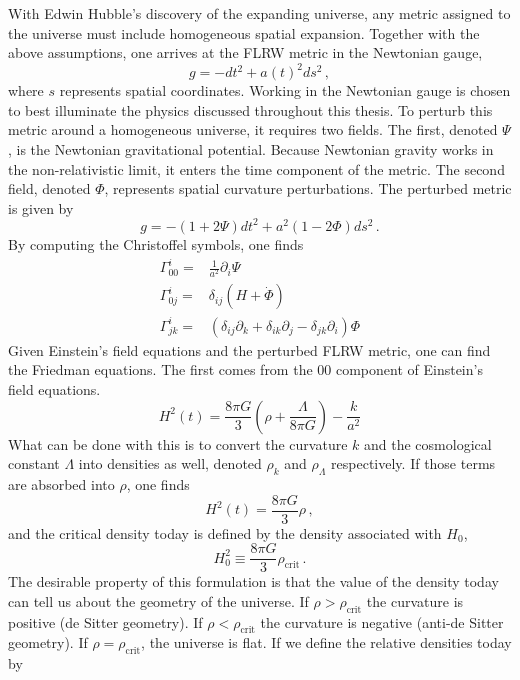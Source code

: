With Edwin Hubble's discovery of the expanding universe, any metric assigned to the universe must include homogeneous spatial expansion. Together with the above assumptions, one arrives at the FLRW metric in the Newtonian gauge,
\begin{equation}
    g = -dt^2 + a(t)^2 ds^2\,,
\end{equation}
where $s$ represents spatial coordinates. Working in the Newtonian gauge is chosen to best illuminate the physics discussed throughout this thesis. To perturb this metric around a homogeneous universe, it requires two fields. The first, denoted $\Psi$, is the Newtonian gravitational potential. Because Newtonian gravity works in the non-relativistic limit, it enters the time component of the metric. The second field, denoted $\Phi$, represents spatial curvature perturbations. The perturbed metric is given by
\begin{equation}
    g = -(1+2\Psi)dt^2 + a^2(1-2\Phi)ds^2\,.
\end{equation}
By computing the Christoffel symbols, one finds
\begin{equation}
    \begin{split}
        \Gamma^i_{00} =& \frac{1}{a^2}\partial_i\Psi \\
        \Gamma^i_{0j} =& \delta_{ij}(H+\dot\Phi) \\
        \Gamma^i_{jk} =& (\delta_{ij} \partial_k + \delta_{ik}\partial_j - \delta_{jk}\partial_i)\Phi
    \end{split}
\end{equation}
Given Einstein's field equations and the perturbed FLRW metric, one can find the Friedman equations. The first comes from the 00 component of Einstein's field equations.
\begin{equation}
    H^2(t) = \frac{8\pi G}{3}\left(\rho + \frac{\Lambda}{8\pi G}\right) - \frac{k}{a^2}
\end{equation}
What can be done with this is to convert the curvature $k$ and the cosmological constant $\Lambda$ into densities as well, denoted $\rho_k$ and $\rho_\Lambda$ respectively. If those terms are absorbed into $\rho$, one finds
\begin{equation}
    H^2(t) = \frac{8\pi G}{3}\rho\,,
\end{equation}
and the critical density today is defined by the density associated with $H_0$,
\begin{equation}
    H_0^2 \equiv \frac{8\pi G}{3}\rho_{\mathrm{crit}}\,.
\end{equation}
The desirable property of this formulation is that the value of the density today can tell us about the geometry of the universe. If $\rho>\rho_{\mathrm{crit}}$ the curvature is positive (de Sitter geometry). If $\rho<\rho_{\mathrm{crit}}$ the curvature is negative (anti-de Sitter geometry). If $\rho=\rho_{\mathrm{crit}}$, the universe is flat. If we define the relative densities today by
